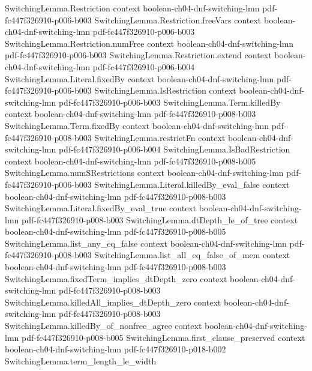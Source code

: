 \begin{theorem}
\proofstep
  {SwitchingLemma.Restriction}
  {context}
  {boolean-ch04-dnf-switching-lmn}
  {pdf-fc447f326910-p006-b003}
\proofstep
  {SwitchingLemma.Restriction.freeVars}
  {context}
  {boolean-ch04-dnf-switching-lmn}
  {pdf-fc447f326910-p006-b003}
\proofstep
  {SwitchingLemma.Restriction.numFree}
  {context}
  {boolean-ch04-dnf-switching-lmn}
  {pdf-fc447f326910-p006-b003}
\proofstep
  {SwitchingLemma.Restriction.extend}
  {context}
  {boolean-ch04-dnf-switching-lmn}
  {pdf-fc447f326910-p006-b004}
\proofstep
  {SwitchingLemma.Literal.fixedBy}
  {context}
  {boolean-ch04-dnf-switching-lmn}
  {pdf-fc447f326910-p006-b003}
\proofstep
  {SwitchingLemma.IsRestriction}
  {context}
  {boolean-ch04-dnf-switching-lmn}
  {pdf-fc447f326910-p006-b003}
\proofstep
  {SwitchingLemma.Term.killedBy}
  {context}
  {boolean-ch04-dnf-switching-lmn}
  {pdf-fc447f326910-p008-b003}
\proofstep
  {SwitchingLemma.Term.fixedBy}
  {context}
  {boolean-ch04-dnf-switching-lmn}
  {pdf-fc447f326910-p008-b003}
\proofstep
  {SwitchingLemma.restrictFn}
  {context}
  {boolean-ch04-dnf-switching-lmn}
  {pdf-fc447f326910-p006-b004}
\proofstep
  {SwitchingLemma.IsBadRestriction}
  {context}
  {boolean-ch04-dnf-switching-lmn}
  {pdf-fc447f326910-p008-b005}
\proofstep
  {SwitchingLemma.numSRestrictions}
  {context}
  {boolean-ch04-dnf-switching-lmn}
  {pdf-fc447f326910-p006-b003}
\proofstep
  {SwitchingLemma.Literal.killedBy_eval_false}
  {context}
  {boolean-ch04-dnf-switching-lmn}
  {pdf-fc447f326910-p008-b003}
\proofstep
  {SwitchingLemma.Literal.fixedBy_eval_true}
  {context}
  {boolean-ch04-dnf-switching-lmn}
  {pdf-fc447f326910-p008-b003}
\proofstep
  {SwitchingLemma.dtDepth_le_of_tree}
  {context}
  {boolean-ch04-dnf-switching-lmn}
  {pdf-fc447f326910-p008-b005}
\proofstep
  {SwitchingLemma.list_any_eq_false}
  {context}
  {boolean-ch04-dnf-switching-lmn}
  {pdf-fc447f326910-p008-b003}
\proofstep
  {SwitchingLemma.list_all_eq_false_of_mem}
  {context}
  {boolean-ch04-dnf-switching-lmn}
  {pdf-fc447f326910-p008-b003}
\proofstep
  {SwitchingLemma.fixedTerm_implies_dtDepth_zero}
  {context}
  {boolean-ch04-dnf-switching-lmn}
  {pdf-fc447f326910-p008-b003}
\proofstep
  {SwitchingLemma.killedAll_implies_dtDepth_zero}
  {context}
  {boolean-ch04-dnf-switching-lmn}
  {pdf-fc447f326910-p008-b003}
\proofstep
  {SwitchingLemma.killedBy_of_nonfree_agree}
  {context}
  {boolean-ch04-dnf-switching-lmn}
  {pdf-fc447f326910-p008-b005}
\proofstep
  {SwitchingLemma.first_clause_preserved}
  {context}
  {boolean-ch04-dnf-switching-lmn}
  {pdf-fc447f326910-p018-b002}
\proofstep
  {SwitchingLemma.term_length_le_width}

\end{theorem}
